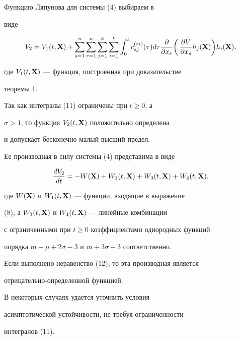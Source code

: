 \begin{pf} Функцию Ляпунова для системы (4) выбираем в 


виде 


$$ 


V_2=V_1(t,\bx)+\sum^n_{s=1}\sum^n_{r=1}\sum^k_{j=1} 


\sum^k_{i=1}\int^t_0 c^{(ri)}_{sj}(\tau)d\tau 


\frac{\partial}{\partial x_r}\biggl(\, 


\frac{\partial V}{\partial x_s}h_j(\bx)\biggr)h_i(\bx), 


$$ 


где $V_1(t,\bold X)$ --- функция, построенная при доказательстве 


теоремы 1. 


 


Так как интегралы (11) ограничены при $t\ge 0$, а 


$\sigma>1$, то функция $V_2(t,\bold X)$ положительно определена 


и допускает бесконечно малый высший предел. 


Ее производная в силу системы (4) представима в виде 


\begin{equation} 


\frac{dV_2}{dt}=-W(\bx)+W_1(t,\bx)+W_3(t,\bx)+W_4(t,\bx), 


\end{equation} 


где $W(\bold X)$ и $W_1(t,\bold X)$ --- функции, входящие в выражение 


(8), а $W_3(t,\bold X)$ и $W_4(t,\bold X)$ --- линейные комбинации 


с ограниченными при $t\ge 0$ коэффициентами однородных функций 


порядка $m+\mu+2\sigma-3$ и $m+3\sigma-3$ соответственно. 


 


Если выполнено неравенство (12), то эта производная является 


отрицательно-определенной функцией. 


\end{pf} 


 


\begin{note} В некоторых случаях удается уточнить условия 


асимптотической устойчивости, не требуя ограниченности 


интегралов (11). 


\end{note} 


